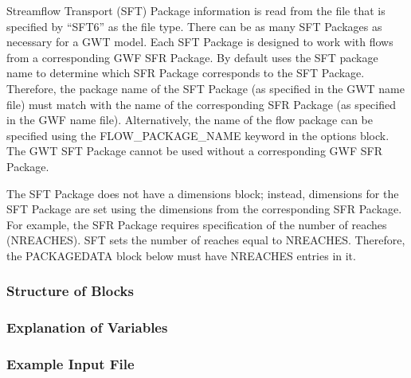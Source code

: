 Streamflow Transport (SFT) Package information is read from the file that is specified by ``SFT6'' as the file type.  There can be as many SFT Packages as necessary for a GWT model. Each SFT Package is designed to work with flows from a corresponding GWF SFR Package. By default \mf uses the SFT package name to determine which SFR Package corresponds to the SFT Package.  Therefore, the package name of the SFT Package (as specified in the GWT name file) must match with the name of the corresponding SFR Package (as specified in the GWF name file).  Alternatively, the name of the flow package can be specified using the FLOW\_PACKAGE\_NAME keyword in the options block.  The GWT SFT Package cannot be used without a corresponding GWF SFR Package.

The SFT Package does not have a dimensions block; instead, dimensions for the SFT Package are set using the dimensions from the corresponding SFR Package.  For example, the SFR Package requires specification of the number of reaches (NREACHES).  SFT sets the number of reaches equal to NREACHES.  Therefore, the PACKAGEDATA block below must have NREACHES entries in it.

\vspace{5mm}
\subsubsection{Structure of Blocks}




\vspace{5mm}
\subsubsection{Explanation of Variables}
\begin{description}

\end{description}

\vspace{5mm}
\subsubsection{Example Input File}


\vspace{5mm}
